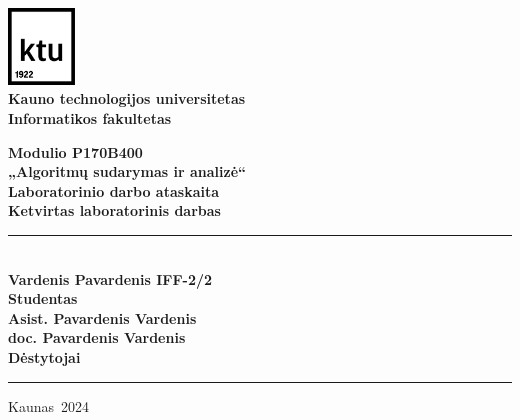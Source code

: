 \begin{titlepage}

    \newcommand{\universitetas}{Kauno technologijos universitetas}
    \newcommand{\fakultetas}{Informatikos fakultetas}
    \newcommand{\modulioKodas}{Modulio P170B400}
    \newcommand{\pavadinimas}{„Algoritmų sudarymas ir analizė“}
    \newcommand{\darboTipas}{Laboratorinio darbo ataskaita}
    \newcommand{\laboratorinisDarbas}{Ketvirtas laboratorinis darbas}
    \newcommand{\autorius}{Vardenis Pavardenis IFF-2/2}
    \newcommand{\statusas}{Studentas}
    \newcommand{\destytojasOne}{Asist. Pavardenis Vardenis}
    \newcommand{\destytojasTwo}{doc. Pavardenis Vardenis}
    \newcommand{\destytojai}{Dėstytojai}
    \newcommand{\miestas}{Kaunas}
    \newcommand{\metai}{2024}
    
    \center
    \includegraphics[width=1.78cm]{nuotraukos/KTU_logo.pdf} \\ [5mm]
    \textbf{\universitetas} \\ [5mm]
    \textbf{\fakultetas} \vfill
    
    \textbf{\modulioKodas} \\ [5mm]
    \LARGE\textbf{\pavadinimas} \\ [10mm]
    \normalsize\textbf{\darboTipas} \\ [5mm]
    \textbf{\laboratorinisDarbas} \vfill
    
    \begin{flushright}
    \rule{0.9\textwidth}{0.4pt} \\ [0.5cm]
    \textbf{\autorius} \\ [5pt]
    \textbf{\statusas} \\ [15pt]
    \textbf{\destytojasOne} \\ [5pt]
    \textbf{\destytojasTwo} \\ [5pt]
    \textbf{\destytojai} \\ [1.5cm]
    \rule{0.9\textwidth}{0.4pt}
    \end{flushright}
    
    \vfill
    \center
    \miestas~\metai
    
    \end{titlepage}